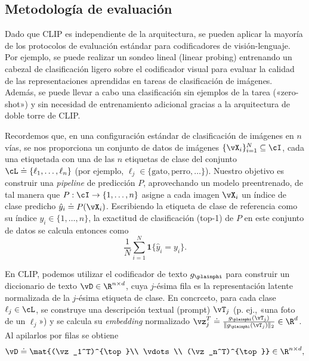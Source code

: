 \documentclass[../../book-main_es.tex]{subfiles}
\begin{document}
\subsection{Metodología de evaluación}\label{sub:clip_eval}
Dado que CLIP es independiente de la arquitectura, se pueden aplicar la mayoría de los 
protocolos de evaluación estándar para codificadores de visión-lenguaje. Por ejemplo, 
se puede realizar un sondeo lineal (linear probing) entrenando un cabezal de clasificación ligero sobre 
el codificador visual para evaluar la calidad de las representaciones aprendidas en 
tareas de clasificación de imágenes. Además, se puede llevar a cabo una clasificación 
sin ejemplos de la tarea («zero-shot») y sin necesidad de entrenamiento adicional gracias a la arquitectura de doble 
torre de CLIP.

Recordemos que, en una configuración estándar de clasificación de imágenes en \(n\) vías, se nos proporciona un conjunto de datos de imágenes
\(\{\vX_i\}_{i=1}^{N}\subseteq\cI\), cada una etiquetada con una de las \(n\) etiquetas de clase del conjunto
\(\cL \doteq \{\ell_1,\ldots,\ell_n\}\) (por ejemplo, \(\ell_j \in \{\text{gato},\text{perro},\ldots\}\)).
Nuestro objetivo es construir una \textit{pipeline} de predicción \(P\), aprovechando un modelo preentrenado, de tal manera que
\(P:\cI\to\{1,\ldots,n\}\) asigne a cada imagen \(\vX_i\) un índice de clase predicho
\(\hat{y}_i \doteq P(\vX_i)\). Escribiendo la etiqueta de clase de referencia como su índice \(y_i \in \{1,\ldots,n\}\),
la exactitud de clasificación (top-1) de \(P\) en este conjunto de datos se calcula entonces como
\[
\frac{1}{N}\sum_{i=1}^{N}\boldsymbol{1}\{\hat{y}_i = y_i\}.
\]

En CLIP, podemos utilizar el codificador de texto \(g_{\plainphi}\) para construir un diccionario 
de texto \(\vD\in\R^{n\times d}\), cuya \(j\)-ésima fila es la representación latente normalizada 
de la \(j\)-ésima etiqueta de clase.
En concrceto, para cada clase \(\ell_j \in \cL\), se construye una descripción textual 
(prompt) \(\vT_j\) (p. ej., «una foto de un \(\ell_j\)») y se calcula su \textit{embedding} normalizado
\(\vz_j^T \doteq \frac{g_{\plainphi}(\vT_j)}{\|g_{\plainphi}(\vT_j)\|_2} \in \R^{d}\). Al apilarlos por filas se obtiene
\[
\vD \doteq 
\mat{(\vz_1^T)^{\top}\\ \vdots \\ (\vz_n^T)^{\top}}
\in \R^{n\times d},
\]
\end{document}

